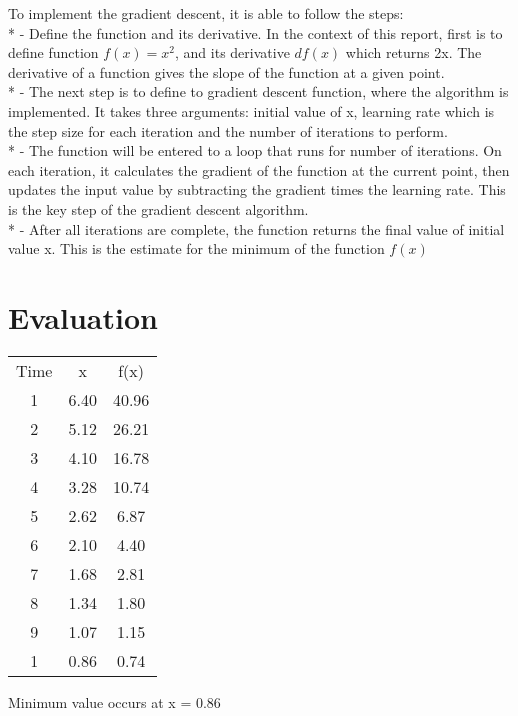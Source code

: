 \documentclass{article}
\begin{document}
To implement the gradient descent, it is able to follow the steps:\\

* - Define the function and its derivative. In the context of this report, first is to define function $f(x) = x^2$, and its derivative $df(x)$ which returns 2x. The derivative of a function gives the slope of the function at a given point.\\

* - The next step is to define to gradient descent function, where the algorithm is implemented. It takes three arguments: initial value of x, learning rate which is the step size for each iteration and the number of iterations to perform.\\

* - The function will be entered to a loop that runs for number of iterations. On each iteration, it calculates the gradient of the function at the current point, then updates the input value by subtracting the gradient times the learning rate. This is the key step of the gradient descent algorithm.\\

* - After all iterations are complete, the function returns the final value of initial value x. This is the estimate for the minimum of the function $f(x)$


\section{Evaluation}

\begin{center}
\begin{tabular}{ c c c }
    Time & x & f(x) \\ 
    1 & 6.40 & 40.96 \\  
    2 & 5.12 & 26.21 \\
    3 & 4.10 & 16.78 \\
    4 & 3.28 & 10.74 \\
    5 & 2.62 & 6.87 \\    
    6 & 2.10 & 4.40  \\    
    7 & 1.68 & 2.81  \\    
    8 & 1.34 & 1.80  \\    
    9 & 1.07 & 1.15  \\    
    1 & 0.86 & 0.74  \\  
\end{tabular}
\end{center}

Minimum value occurs at x = 0.86\\
\end{document}
